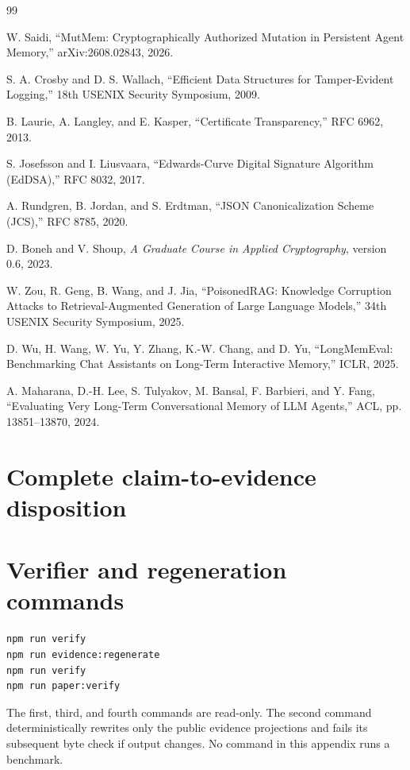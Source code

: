 \documentclass[10pt]{article}
\begin{document}
\begin{thebibliography}{99}

W. Saidi,
``MutMem: Cryptographically Authorized Mutation in Persistent Agent Memory,''
arXiv:2608.02843, 2026.

S. A. Crosby and D. S. Wallach,
``Efficient Data Structures for Tamper-Evident Logging,''
18th USENIX Security Symposium, 2009.

B. Laurie, A. Langley, and E. Kasper,
``Certificate Transparency,'' RFC 6962, 2013.

S. Josefsson and I. Liusvaara,
``Edwards-Curve Digital Signature Algorithm (EdDSA),'' RFC 8032, 2017.

A. Rundgren, B. Jordan, and S. Erdtman,
``JSON Canonicalization Scheme (JCS),'' RFC 8785, 2020.

D. Boneh and V. Shoup,
\emph{A Graduate Course in Applied Cryptography}, version 0.6, 2023.

W. Zou, R. Geng, B. Wang, and J. Jia,
``PoisonedRAG: Knowledge Corruption Attacks to Retrieval-Augmented Generation
of Large Language Models,'' 34th USENIX Security Symposium, 2025.

D. Wu, H. Wang, W. Yu, Y. Zhang, K.-W. Chang, and D. Yu,
``LongMemEval: Benchmarking Chat Assistants on Long-Term Interactive Memory,''
ICLR, 2025.

A. Maharana, D.-H. Lee, S. Tulyakov, M. Bansal, F. Barbieri, and Y. Fang,
``Evaluating Very Long-Term Conversational Memory of LLM Agents,''
ACL, pp. 13851--13870, 2024.

\end{thebibliography}

\appendix
\section{Complete claim-to-evidence disposition}



\section{Verifier and regeneration commands}

\begin{verbatim}
npm run verify
npm run evidence:regenerate
npm run verify
npm run paper:verify
\end{verbatim}

The first, third, and fourth commands are read-only. The second command
deterministically rewrites only the public evidence projections and fails its
subsequent byte check if output changes. No command in this appendix runs a
benchmark.
\end{document}
